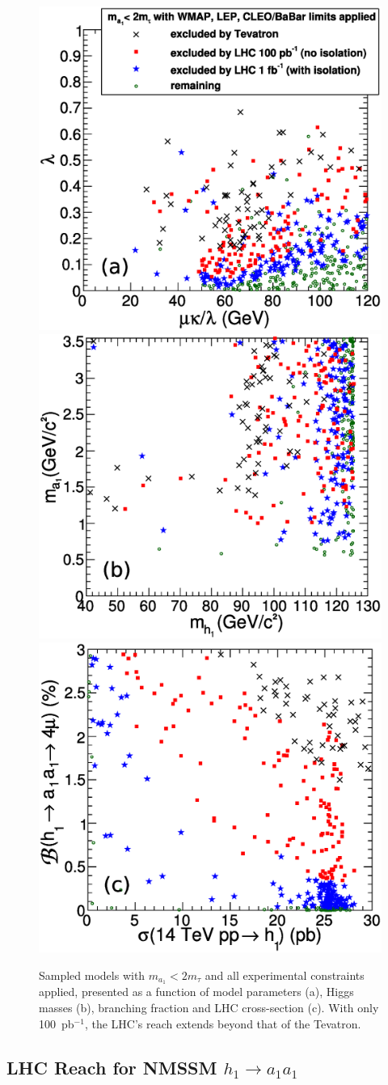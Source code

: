 \documentclass[aps,prl,twocolumn,nofootinbib,superscriptaddress]{revtex4}
\begin{document}
\begin{figure}[htbp]
\includegraphics[width=0.32\linewidth]{newlhcconstraints_params}
\hfill
\includegraphics[width=0.32\linewidth]{newlhcconstraints_masses}
\hfill
\includegraphics[width=0.32\linewidth]{newlhcconstraints_crosbr}

\caption{Sampled models with $m_{a_1} < 2m_\tau$ and all experimental
  constraints applied, presented as a function of model parameters
  (a), Higgs masses (b), branching fraction and LHC cross-section (c).
  With only 100~pb$^{-1}$, the LHC's reach extends beyond that of the
  Tevatron. \label{fig:lhcexclusion}}
\end{figure}

\subsection{LHC Reach for NMSSM $h_1 \to a_1 a_1$}
\end{document}
